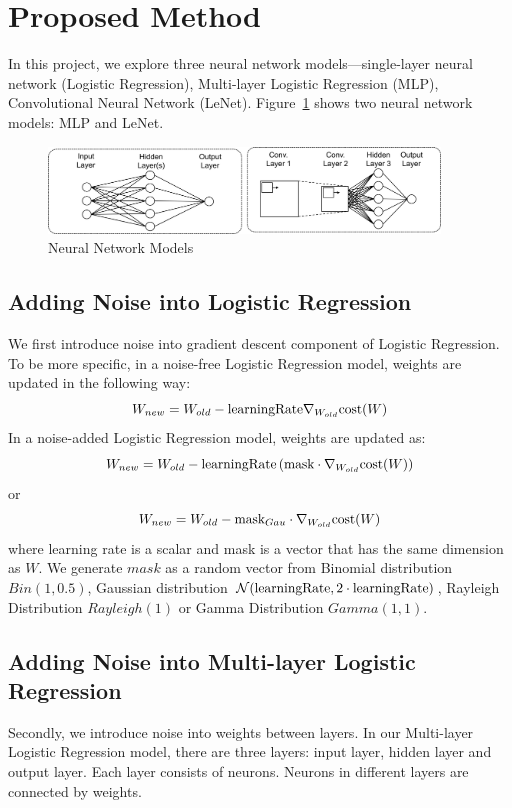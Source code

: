 \section{Proposed Method}
\label{sec:method}
In this project, we explore three neural network models---single-layer
neural network (Logistic Regression), Multi-layer Logistic Regression
(MLP), Convolutional Neural Network (LeNet).
Figure~\ref{fig:networks} shows two neural network models: MLP and LeNet.
\begin{figure}[!htbp]
\centering
\includegraphics[width=295pt]{f-figs/networks}
\caption{Neural Network Models}
\label{fig:networks}
\end{figure}

\subsection{Adding Noise into Logistic Regression}
We first introduce noise into gradient descent component
of Logistic Regression.
To be more specific, in a noise-free Logistic Regression model, weights
are updated in the following way:
\[
W_{new} = W_{old} - \text{learningRate} \nabla_{W_{old}} \text{cost}(W)
\]
In a noise-added Logistic Regression model, weights are updated as:
\[
W_{new}=W_{old}-\text{learningRate} \left(\text{mask} \cdot \nabla_{W_{old}}\text{cost}(W) \right)
\]
or
\[
W_{new} = W_{old} - \text{mask}_{Gau} \cdot \nabla_{W_{old}} \text{cost}(W)
\]
where learning rate is a scalar and mask is a vector that has the same dimension as $W$.
We generate $mask$ as a random vector from Binomial distribution
$Bin(1,0.5)$, Gaussian distribution $\mathcal{N}(\text{learningRate}, 2 \cdot \text{learningRate})$,
Rayleigh Distribution $Rayleigh(1)$ or Gamma Distribution $Gamma(1,1)$.

\subsection{Adding Noise into Multi-layer Logistic Regression}
Secondly, we introduce noise into weights between layers.
In our Multi-layer Logistic Regression model, there are three layers:
input layer, hidden layer and output layer. Each layer consists of
neurons. Neurons in different layers are connected by weights.

